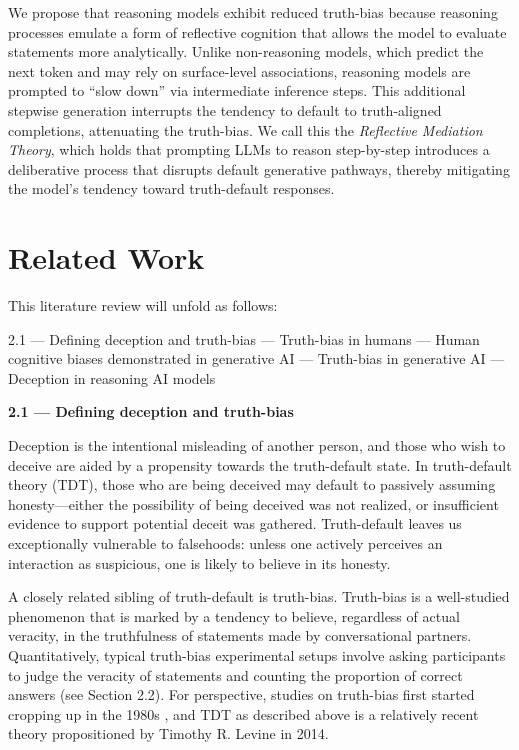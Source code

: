 \documentclass{article}
\begin{document}
We propose that reasoning models exhibit reduced truth-bias because reasoning processes emulate a form of reflective cognition that allows the model to evaluate statements more analytically. Unlike non-reasoning models, which predict the next token and may rely on surface-level associations, reasoning models are prompted to ``slow down'' via intermediate inference steps. This additional stepwise generation interrupts the tendency to default to truth-aligned completions, attenuating the truth-bias. We call this the \textit{Reflective Mediation Theory}, which holds that prompting LLMs to reason step-by-step introduces a deliberative process that disrupts default generative pathways, thereby mitigating the model’s tendency toward truth-default responses.

\section{Related Work}

This literature review will unfold as follows:

2.1 --- Defining deception and truth-bias  --- Truth-bias in humans  --- Human cognitive biases demonstrated in generative AI  --- Truth-bias in generative AI  --- Deception in reasoning AI models \newline

\textbf{2.1 --- Defining deception and truth-bias}

Deception is the intentional misleading of another person, and those who wish to deceive are aided by a propensity towards the truth-default state. In truth-default theory (TDT), those who are being deceived may default to passively assuming honesty---either the possibility of being deceived was not realized, or insufficient evidence to support potential deceit was gathered. Truth-default leaves us exceptionally vulnerable to falsehoods: unless one actively perceives an interaction as suspicious, one is likely to believe in its honesty. \citep{levine_truth-default_2022}

A closely related sibling of truth-default is truth-bias. Truth-bias is a well-studied phenomenon that is marked by a tendency to believe, regardless of actual veracity, in the truthfulness of statements made by conversational partners. \citep{pantazi_power_2018} Quantitatively, typical truth-bias experimental setups involve asking participants to judge the veracity of statements and counting the proportion of correct answers (see Section 2.2). For perspective, studies on truth-bias first started cropping up in the 1980s \citep{mccornack_deception_1986}, and TDT as described above is a relatively recent theory propositioned by Timothy R. Levine in 2014. 
\end{document}
